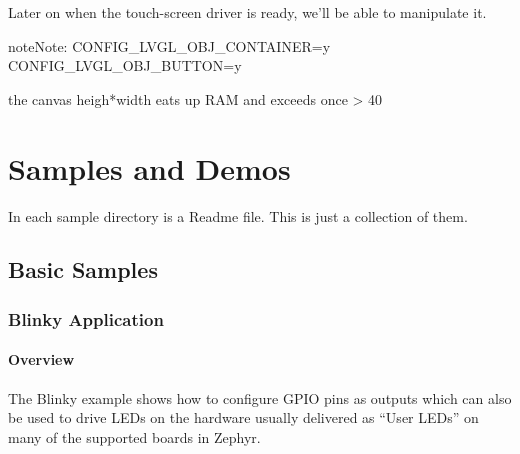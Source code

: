 \documentclass[letterpaper,10pt,english]{sphinxmanual}
\begin{document}
Later on when the touch-screen driver is ready, we’ll be able to manipulate it.

\begin{sphinxVerbatim}[commandchars=\\\{\}]
\end{sphinxVerbatim}

\begin{sphinxadmonition}{note}{Note:}
CONFIG\_LVGL\_OBJ\_CONTAINER=y
CONFIG\_LVGL\_OBJ\_BUTTON=y
\end{sphinxadmonition}

\begin{sphinxVerbatim}[commandchars=\\\{\}]

\end{sphinxVerbatim}

 the canvas heigh*width eats up RAM and exceeds once \textgreater{} 40


\chapter{Samples and Demos}
\label{\detokenize{samples/index:samples-and-demos}}\label{\detokenize{samples/index:id1}}\label{\detokenize{samples/index::doc}}
In each sample directory is a Readme file.
This is just a collection of them.


\section{Basic Samples}
\label{\detokenize{samples/basic/basic:basic-samples}}\label{\detokenize{samples/basic/basic:basic-sample}}\label{\detokenize{samples/basic/basic::doc}}

\subsection{Blinky Application}
\label{\detokenize{samples/basic/blinky/README:blinky-application}}\label{\detokenize{samples/basic/blinky/README:blinky-sample}}\label{\detokenize{samples/basic/blinky/README::doc}}

\subsubsection{Overview}
\label{\detokenize{samples/basic/blinky/README:overview}}
The Blinky example shows how to configure GPIO pins as outputs which can also be
used to drive LEDs on the hardware usually delivered as “User LEDs” on many of
the supported boards in Zephyr.
\end{document}
